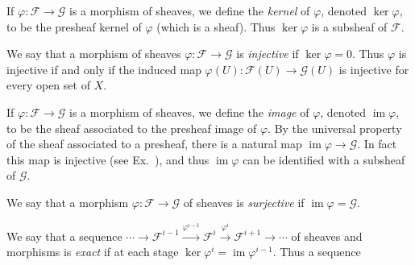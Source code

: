 {If $\varphi\colon\mathcal F\to\mathcal G$ is a morphism of sheaves, we define the \emph{kernel} of $\varphi$, denoted $\ker\varphi$, to be the presheaf kernel of $\varphi$ (which is a sheaf). Thus $\ker\varphi$ is a subsheaf of $\mathcal F$.

We say that a morphism of sheaves $\varphi\colon\mathcal F\to\mathcal G$ is \emph{injective} if $\ker\varphi=0$. Thus $\varphi$ is injective if and only if the induced map $\varphi(U)\colon\mathcal F(U)\to\mathcal G(U)$ is injective for every open set of $X$.

If $\varphi\colon\mathcal F\to\mathcal G$ is a morphism of sheaves, we define the \emph{image} of $\varphi$, denoted $\operatorname{im}\varphi$, to be the sheaf associated to the presheaf image of $\varphi$. By the universal property of the sheaf associated to a presheaf, there is a natural map $\operatorname{im}\varphi\to\mathcal G$. In fact this map is injective (see Ex.~), and thus $\operatorname{im}\varphi$ can be identified with a subsheaf of $\mathcal G$.

We say that a morphism $\varphi\colon\mathcal F\to\mathcal G$ of sheaves is \emph{surjective} if $\operatorname{im}\varphi=\mathcal G$.

\smallskip
We say that a sequence $\cdots\to\mathcal F^{i-1}\xrightarrow{\varphi^{i-1}}\mathcal F^i\xrightarrow{\varphi^i}\mathcal F^{i+1}\to\cdots$ of sheaves and morphisms is \emph{exact} if at each stage $\ker\varphi^i=\operatorname{im}\varphi^{i-1}$. Thus a sequence
}
